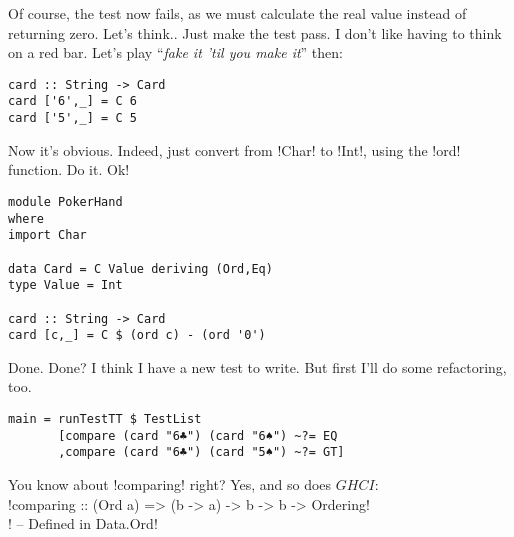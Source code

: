 \failure Of course, the test now fails, as we must calculate the real value instead of returning zero. Let's think..
\lhN \failure Just make the test pass. I don't like having to think on a red bar.
\lhA \failure Let's play ``\emph{fake it 'til you make it}'' then:
\begin{lstlisting}[frame=single]
card :: String -> Card
card ['6',_] = C 6
card ['5',_] = C 5 
\end{lstlisting}
\success Now it's obvious.
\lhN \success Indeed, just convert from \il!Char! to \il!Int!, using the \il!ord! function. Do it.
\lhA \success Ok!
\begin{lstlisting}[frame=single]
module PokerHand
where
import Char

data Card = C Value deriving (Ord,Eq)
type Value = Int

card :: String -> Card
card [c,_] = C $ (ord c) - (ord '0')
\end{lstlisting} %
\success Done.
\lhN Done? I think I have a new test to write. But first I'll do some refactoring, too.
\begin{lstlisting}[frame=single]
main = runTestTT $ TestList 
       [compare (card "6♣") (card "6♠") ~?= EQ
       ,compare (card "6♣") (card "5♠") ~?= GT]
\end{lstlisting} %
You know about \il!comparing! right?
\lhA Yes, and so does $GHCI$: \\

\il!comparing :: (Ord a) => (b -> a) -> b -> b -> Ordering! \\
\il! -- Defined in Data.Ord! \\



